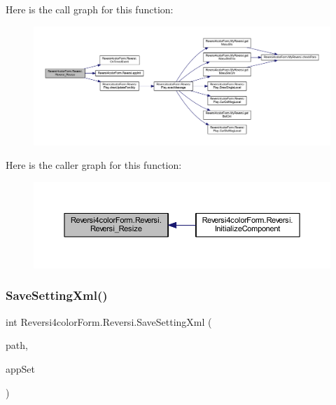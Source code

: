 Here is the call graph for this function\+:
\nopagebreak
\begin{figure}[H]
\begin{center}
\leavevmode
\includegraphics[width=350pt]{class_reversi4color_form_1_1_reversi_afacffb0f4d383892677acfd1b7304606_cgraph}
\end{center}
\end{figure}
Here is the caller graph for this function\+:
\nopagebreak
\begin{figure}[H]
\begin{center}
\leavevmode
\includegraphics[width=350pt]{class_reversi4color_form_1_1_reversi_afacffb0f4d383892677acfd1b7304606_icgraph}
\end{center}
\end{figure}
\mbox{\label{class_reversi4color_form_1_1_reversi_aff9f10404fc96f56154073d324d4dea2}} 
\subsubsection{\texorpdfstring{Save\+Setting\+Xml()}{SaveSettingXml()}}
{\footnotesize\ttfamily int Reversi4color\+Form.\+Reversi.\+Save\+Setting\+Xml (\begin{DoxyParamCaption}\item[{string}]{path,  }\item[{ref \hyperlink{class_reversi4color_form_1_1_reversi_setting}{Reversi\+Setting}}]{app\+Set }\end{DoxyParamCaption})}




